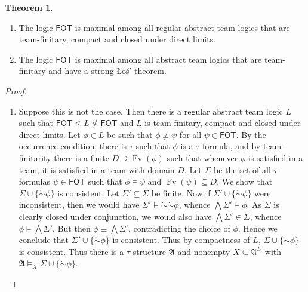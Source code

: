 \documentclass[a4paper]{amsart}
\theoremstyle{definition}
\newtheorem{theorem}[definition]{Theorem}
\theoremstyle{remark}
\newcommand{\A}{\mathcal{A}}
\DeclareMathOperator{\Fv}{Fv}
\newcommand{\cneg}{\mathord{\dot{\sim}}}
\newcommand\fot{\mathsf{FOT}}
\theoremstyle{definition}
\renewcommand{\A}{\mathfrak{A}}
\begin{document}
\begin{theorem}\quad
    \begin{enumerate}
        \item The logic $\fot$ is maximal among all regular abstract team logics that are team-finitary, compact and closed under direct limits.
        \item The logic $\fot$ is maximal among all %
        abstract team logics that are team-finitary and have a strong Łoś' theorem.
    \end{enumerate}
\end{theorem}
\begin{proof}\quad
    \renewcommand{\i}{\mathcal i}
    \renewcommand{\j}{\mathcal j}
    \begin{enumerate}
        \item Suppose this is not the case. Then there is a regular abstract team logic $L$ such that $\fot\leq L\nleq \fot$ and $L$ is team-finitary, compact and closed under direct limits. Let $\phi\in L$ be such that $\phi\not\equiv\psi$ for all $\psi\in\fot$. By the occurrence condition, there is $\tau$ such that $\phi$ is a $\tau$-formula, and by team-finitarity there is a finite $D\supseteq\Fv(\phi)$ such that whenever $\phi$ is satisfied in a team, it is satisfied in a team with domain $D$. Let $\Sigma$ be the set of all $\tau$-formulas $\psi\in\fot$ such that $\phi\models\psi$ and $\Fv(\psi)\subseteq D$. We show that $\Sigma\cup\{\cneg\phi\}$ is consistent. Let $\Sigma'\subseteq\Sigma$ be finite. Now if $\Sigma'\cup\{\cneg\phi\}$ were inconsistent, then we would have $\Sigma'\models\cneg\cneg\phi$, whence $\bigwedge\Sigma'\models\phi$. As $\Sigma$ is clearly closed under conjunction, we would also have $\bigwedge\Sigma'\in\Sigma$, whence $\phi\models\bigwedge\Sigma'$. But then $\phi\equiv\bigwedge\Sigma'$, contradicting the choice of $\phi$. Hence we conclude that $\Sigma'\cup\{\cneg\phi\}$ is consistent. Thus by compactness of $L$, $\Sigma\cup\{\cneg\phi\}$ is consistent. Thus there is a $\tau$-structure $\A$ and nonempty $X\subseteq\A^D$ with $\A\models_X\Sigma\cup\{\cneg\phi\}$.
        

\end{enumerate}
\end{proof}
\end{document}
